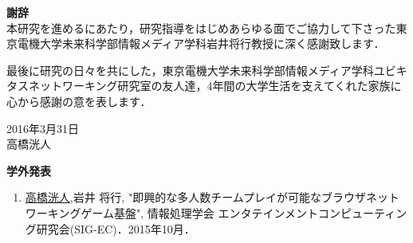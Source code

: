 \newpage
\pagestyle{empty}

\begin{flushleft}
{\huge{\bf 謝辞}}\\
\vspace{1cm}
本研究を進めるにあたり，研究指導をはじめあらゆる面でご協力して下さった東京電機大学未来科学部情報メディア学科岩井将行教授に深く感謝致します．
\par
最後に研究の日々を共にした，東京電機大学未来科学部情報メディア学科ユビキタスネットワーキング研究室の友人達，4年間の大学生活を支えてくれた家族に心から感謝の意を表します．\\

\vspace{3cm}
\begin{flushright}
2016年3月31日\\
高橋洸人\\
\end{flushright}
\end{flushleft}



\newpage



\begin{flushleft}
{\huge{\bf 学外発表}}\\
\vspace{1cm}
\begin{enumerate}
	
\item \underline{高橋洸人},岩井 将行, "即興的な多人数チームプレイが可能なブラウザネットワーキングゲーム基盤", 情報処理学会 エンタテインメントコンピューティング研究会(SIG-EC)．2015年10月．

\end{enumerate}
\end{flushleft}

\newpage

\renewcommand{\bibname}{参考文献}

